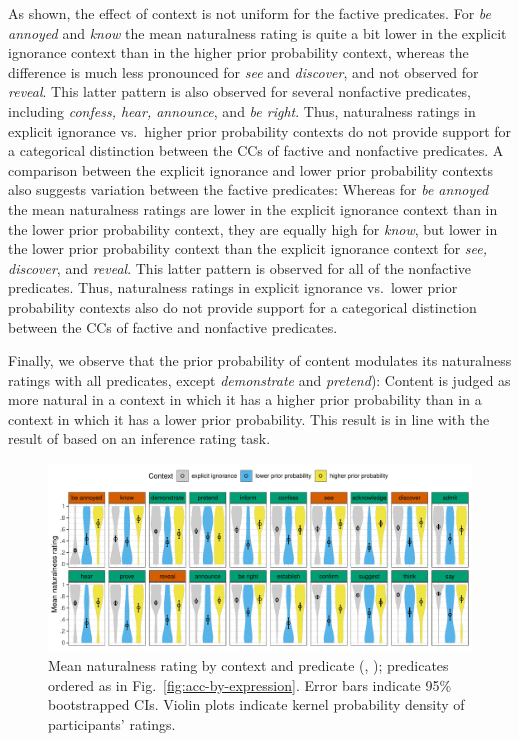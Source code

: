 \documentclass[11pt,fleqn]{article}
\newcommand{\6}{\mbox{$[\hspace*{-.6mm}[$}}
\newcommand{\9}{\mbox{$]\hspace*{-.6mm}]$}}
\begin{document}
As shown, the effect of context is not uniform for the factive predicates. For {\em be annoyed} and {\em know} the mean naturalness rating is quite a bit lower in the explicit ignorance context than in the higher prior probability context, whereas the difference is much less pronounced for {\em see} and {\em discover}, and not observed for {\em reveal}. This latter pattern is also observed for several nonfactive predicates, including {\em confess, hear, announce}, and {\em be right}. Thus, naturalness ratings in explicit ignorance vs.\ higher prior probability contexts do not provide support for a categorical distinction between the CCs of factive and nonfactive predicates. A comparison between the explicit ignorance and lower prior probability contexts also suggests variation between the factive predicates: Whereas for {\em be annoyed} the mean naturalness ratings are lower in the explicit ignorance context than in the lower prior probability context, they are equally high for {\em know}, but lower in the lower prior probability context than the explicit ignorance context for {\em see, discover}, and {\em reveal}. This latter pattern is observed for all of the nonfactive predicates. Thus, naturalness ratings in explicit ignorance vs.\ lower prior probability contexts also do not provide support for a categorical distinction between the CCs of factive and nonfactive predicates. 

Finally, we observe that the prior probability of content modulates its naturalness ratings with all predicates, except {\em demonstrate} and {\em pretend}): Content is judged as more natural in a context in which it has a higher prior probability than in a context in which it has a lower prior probability. This result is in line with the result of \citealt{degen-tonhauser-openmind} based on an inference rating task.

\begin{figure}[h!]
\centering
\includegraphics[width=\textwidth]{../../results/main/13explicitIgnorance/graphs/naturalness-by-context-and-predicate}
\caption{\small{Mean naturalness rating by context and predicate (, ); predicates ordered as in Fig.~\ref{fig:acc-by-expression}. Error bars indicate 95\% bootstrapped CIs. Violin plots indicate kernel probability density of participants' ratings}.}\label{fig:acc-by-context}
\end{figure}
\end{document}
